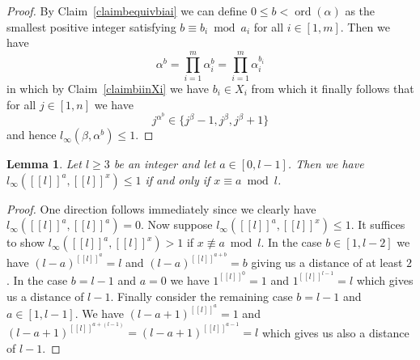 \documentclass{article}
\newtheorem{lemma}{Lemma}
\newcommand{\llbracket}{[\![}
\newcommand{\rrbracket}{]\!]}
\DeclareMathOperator{\ord}{ord}
\begin{document}
\begin{proof}
By Claim~\ref{claimbequivbiai} we can define $0 \leq b < \ord(\alpha)$ as the smallest positive integer satisfying $b \equiv b_i \bmod a_i$ for all $i \in [1,m]$. Then we have
\begin{displaymath}
\alpha^b = \prod_{i=1}^m \alpha_i^b = \prod_{i=1}^m \alpha_i^{b_i}
\end{displaymath}
in which by Claim~\ref{claimbiinXi} we have $b_i \in X_i$ from which it finally follows that for all $j \in [1,n]$ we have
\begin{displaymath}
j^{\alpha^b} \in \{j^\beta-1,j^\beta,j^\beta+1\}
\end{displaymath}
and hence $l_\infty(\beta, \alpha^b) \leq 1$.
\end{proof}

\begin{lemma}\label{linfty31lemma2}
Let $l \geq 3$ be an integer and let $a \in [0,l-1]$. Then we have $l_\infty(\llbracket l \rrbracket^a, \llbracket l \rrbracket^x) \leq 1$ if and only if $x \equiv a \bmod l$.
\end{lemma}
\begin{proof}
One direction follows immediately since we clearly have $l_\infty(\llbracket l \rrbracket^a, \llbracket l \rrbracket^a) = 0$. Now suppose $l_\infty(\llbracket l \rrbracket^a, \llbracket l \rrbracket^x) \leq 1$. It suffices to show $l_\infty(\llbracket l \rrbracket^a, \llbracket l \rrbracket^x) > 1$ if $x \not \equiv a \bmod l$. In the case $b \in [1,l-2]$ we have $(l-a)^{\llbracket l \rrbracket^a} = l$ and $(l-a)^{\llbracket l \rrbracket^{a+b}} = b$ giving us a distance of at least $2$. In the case $b=l-1$ and $a=0$ we have $1^{\llbracket l \rrbracket^0} = 1$ and $1^{\llbracket l \rrbracket^{l-1}} = l$ which gives us a distance of $l-1$. Finally consider the remaining case $b=l-1$ and $a \in [1,l-1]$. We have $(l-a+1)^{\llbracket l \rrbracket^a} = 1$ and $(l-a+1)^{\llbracket l \rrbracket^{a+(l-1)}} = (l-a+1)^{\llbracket l \rrbracket^{a-1}} = l$ which gives us also a distance of $l-1$.
\end{proof}
\end{document}
